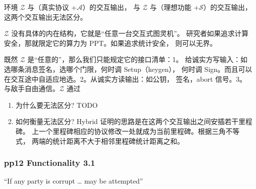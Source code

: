 环境 $\mathcal{Z}$ 与（真实协议 +$\mathcal{A}$）的交互输出，
与 $\mathcal{Z}$ 与（理想功能 +$\mathcal{S}$）的交互输出，
这两个交互输出无法区分。

$\mathcal{Z}$ 没有具体的内在结构，它就是“任意一台交互式图灵机”。
研究者如果追求计算安全，那就限定它的算力为 PPT。如果追求统计安全，
则可以无界。

既然 $\mathcal{Z}$ 是“任意的”，那么我们只能规定它的接口清单：1。
给诚实方写输入：如选哪条消息签名，选哪个门限，何时调 Setup（keygen），
何时调 Sign。而且可以在交互途中自适应地选。2。从诚实方读输出：如公钥，
签名，abort 信号。3。与敌手自由通信。$\mathcal{Z}$ 通过

\begin{enumerate}
\def\labelenumi{(\arabic{enumi})}
\setcounter{enumi}{1}
\item
  为什么要无法区分? TODO
\item
  如何衡量无法区分? Hybrid
  证明的思路是在这两个交互输出之间安插若干里程碑。
  上一个里程碑相应的协议修改一处就成为当前里程碑。根据三角不等式，
  两端的统计距离不大于相邻里程碑统计距离之和。
\end{enumerate}

\subsubsection{pp12 Functionality 3.1}\label{pp12-functionality-3.1}

“If any party is corrupt \ldots{} may be attempted”
